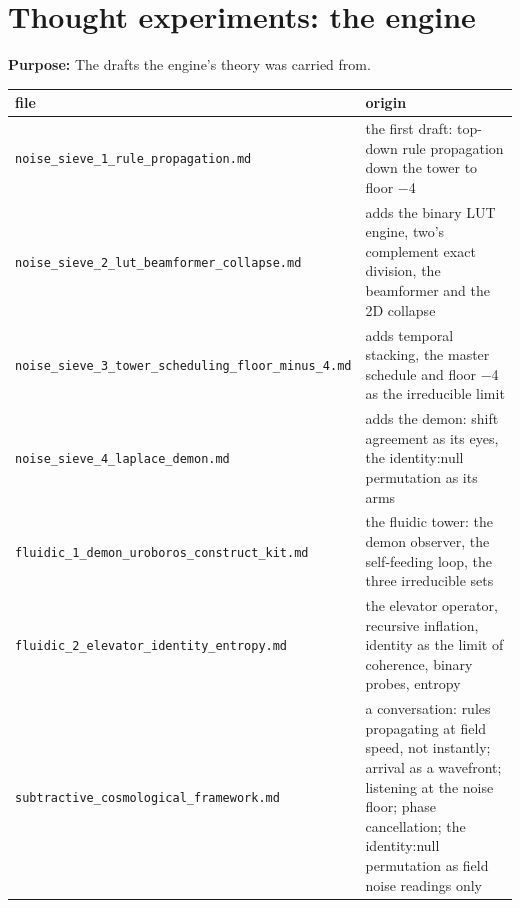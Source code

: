 \chapter{\texorpdfstring{Thought experiments: the engine}{Thought experiments: the engine}}
\label{chap:readme}

\textbf{Purpose:} The drafts the engine's theory was carried from.

{\small
\setlength{\tabcolsep}{6pt}
\begin{longtable}{>{\RaggedRight\arraybackslash}p{}>{\RaggedRight\arraybackslash}p{}}
\toprule
file & origin \\
\midrule
\endhead
\texttt{noise\_\allowbreak{}sieve\_\allowbreak{}1\_\allowbreak{}rule\_\allowbreak{}propagation.\allowbreak{}md} & the first draft: top-down rule propagation down the tower to floor −4 \\
\texttt{noise\_\allowbreak{}sieve\_\allowbreak{}2\_\allowbreak{}lut\_\allowbreak{}beamformer\_\allowbreak{}collapse.\allowbreak{}md} & adds the binary LUT engine, two's complement exact division, the beamformer and the 2D collapse \\
\texttt{noise\_\allowbreak{}sieve\_\allowbreak{}3\_\allowbreak{}tower\_\allowbreak{}scheduling\_\allowbreak{}floor\_\allowbreak{}minus\_\allowbreak{}4.\allowbreak{}md} & adds temporal stacking, the master schedule and floor −4 as the irreducible limit \\
\texttt{noise\_\allowbreak{}sieve\_\allowbreak{}4\_\allowbreak{}laplace\_\allowbreak{}demon.\allowbreak{}md} & adds the demon: shift agreement as its eyes, the identity:null permutation as its arms \\
\texttt{fluidic\_\allowbreak{}1\_\allowbreak{}demon\_\allowbreak{}uroboros\_\allowbreak{}construct\_\allowbreak{}kit.\allowbreak{}md} & the fluidic tower: the demon observer, the self-feeding loop, the three irreducible sets \\
\texttt{fluidic\_\allowbreak{}2\_\allowbreak{}elevator\_\allowbreak{}identity\_\allowbreak{}entropy.\allowbreak{}md} & the elevator operator, recursive inflation, identity as the limit of coherence, binary probes, entropy \\
\texttt{subtractive\_\allowbreak{}cosmological\_\allowbreak{}framework.\allowbreak{}md} & a conversation: rules propagating at field speed, not instantly; arrival as a wavefront; listening at the noise floor; phase cancellation; the identity:null permutation as field noise readings only \\

\end{longtable}}
